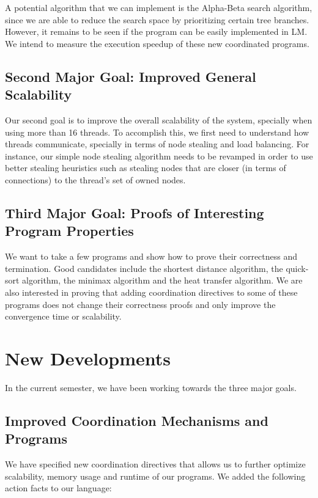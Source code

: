 \documentclass[10pt]{article}
\begin{document}
A potential algorithm that we can implement is the Alpha-Beta search algorithm,
since we are able to reduce the search space by prioritizing certain tree branches.
However, it remains to be seen if the program can be easily implemented in LM.
We intend to measure the execution speedup of these new coordinated programs.

\subsection{Second Major Goal: Improved General Scalability}

Our second goal is to improve the overall scalability of the system, specially
when using more than 16 threads. To accomplish this, we first need to understand
how threads communicate, specially in terms of node stealing and load balancing.
For instance, our simple node stealing algorithm needs to be revamped in order
to use better stealing heuristics such as stealing nodes that are closer (in
terms of connections) to the thread's set of owned nodes.

\subsection{Third Major Goal: Proofs of Interesting Program Properties}

We want to take a few programs and show how to prove their correctness and
termination.  Good candidates include the shortest distance
algorithm, the quick-sort algorithm, the minimax algorithm and the heat transfer
algorithm. We are also interested in proving that adding coordination directives
to some of these programs does not change their correctness proofs and only
improve the convergence time or scalability.

\section{New Developments}

In the current semester, we have been working towards the three major goals.

\subsection{Improved Coordination Mechanisms and Programs}

We have specified new coordination directives that allows us to further
optimize scalability, memory usage and runtime of our programs. We added the
following action facts to our language:
\end{document}
